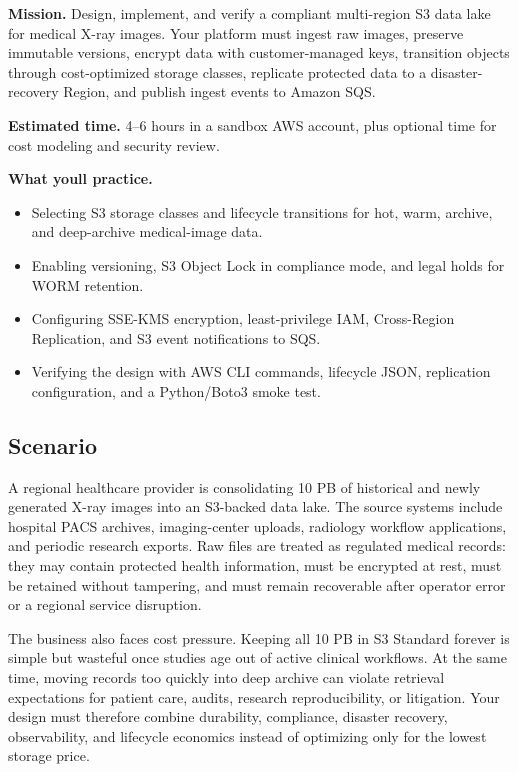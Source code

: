 \begin{capstonebox}
\textbf{Mission.} Design, implement, and verify a compliant multi-region S3 data lake for medical X-ray images. Your platform must ingest raw images, preserve immutable versions, encrypt data with customer-managed keys, transition objects through cost-optimized storage classes, replicate protected data to a disaster-recovery Region, and publish ingest events to Amazon SQS.

\textbf{Estimated time.} 4--6 hours in a sandbox AWS account, plus optional time for cost modeling and security review.

\textbf{What you\textquotesingle{}ll practice.}
\begin{itemize}
    \item Selecting S3 storage classes and lifecycle transitions for hot, warm, archive, and deep-archive medical-image data.
    \item Enabling versioning, S3 Object Lock in compliance mode, and legal holds for WORM retention.
    \item Configuring SSE-KMS encryption, least-privilege IAM, Cross-Region Replication, and S3 event notifications to SQS.
    \item Verifying the design with AWS CLI commands, lifecycle JSON, replication configuration, and a Python/Boto3 smoke test.
\end{itemize}
\end{capstonebox}

\subsection*{Scenario}
A regional healthcare provider is consolidating 10 PB of historical and newly generated X-ray images into an S3-backed data lake. The source systems include hospital PACS archives, imaging-center uploads, radiology workflow applications, and periodic research exports. Raw files are treated as regulated medical records: they may contain protected health information, must be encrypted at rest, must be retained without tampering, and must remain recoverable after operator error or a regional service disruption.

The business also faces cost pressure. Keeping all 10 PB in S3 Standard forever is simple but wasteful once studies age out of active clinical workflows. At the same time, moving records too quickly into deep archive can violate retrieval expectations for patient care, audits, research reproducibility, or litigation. Your design must therefore combine durability, compliance, disaster recovery, observability, and lifecycle economics instead of optimizing only for the lowest storage price.

